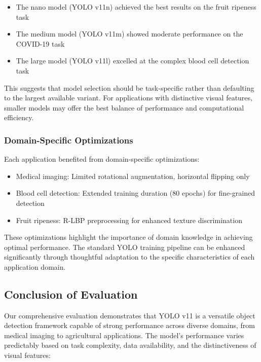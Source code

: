 \begin{multicols}{2}
\begin{itemize}
    \item The nano model (YOLO v11n) achieved the best results on the fruit ripeness task
    \item The medium model (YOLO v11m) showed moderate performance on the COVID-19 task
    \item The large model (YOLO v11l) excelled at the complex blood cell detection task
\end{itemize}

This suggests that model selection should be task-specific rather than defaulting to the largest available variant. For applications with distinctive visual features, smaller models may offer the best balance of performance and computational efficiency.

\subsubsection{Domain-Specific Optimizations}

Each application benefited from domain-specific optimizations:

\begin{itemize}
    \item Medical imaging: Limited rotational augmentation, horizontal flipping only
    \item Blood cell detection: Extended training duration (80 epochs) for fine-grained detection
    \item Fruit ripeness: R-LBP preprocessing for enhanced texture discrimination
\end{itemize}

These optimizations highlight the importance of domain knowledge in achieving optimal performance. The standard YOLO training pipeline can be enhanced significantly through thoughtful adaptation to the specific characteristics of each application domain.

\subsection{Conclusion of Evaluation}

Our comprehensive evaluation demonstrates that YOLO v11 is a versatile object detection framework capable of strong performance across diverse domains, from medical imaging to agricultural applications. The model's performance varies predictably based on task complexity, data availability, and the distinctiveness of visual features:


\end{multicols}
